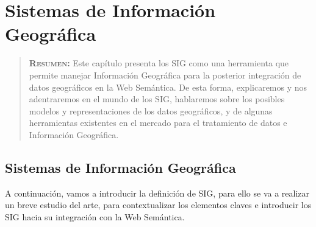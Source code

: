 

\chapter{Sistemas de Información Geográfica}
\label{ch:sig}

\begin{quote}
  	{\bf\textsc{Resumen:}} Este capítulo presenta los SIG como una herramienta que permite manejar Información Geográfica para la posterior integración de datos geográficos en la Web Semántica. De esta forma, explicaremos y nos adentraremos en el mundo de los SIG, hablaremos sobre los posibles modelos y representaciones de los datos geográficos, y de algunas herramientas existentes en el mercado para el tratamiento de datos e Información Geográfica.
\end{quote}


\section{Sistemas de Información Geográfica}

A continuación, vamos a introducir la definición de SIG, para ello se va a realizar un breve estudio del arte, para contextualizar los elementos claves e introducir los SIG hacia su integración con la Web Semántica.

